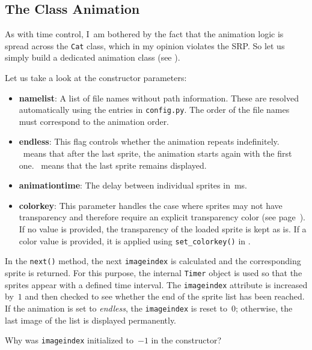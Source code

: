 \subsection{The Class Animation}

As with time control, I~am bothered by the fact that the animation logic is spread across the \texttt{Cat} class, which in my opinion violates the SRP. So let us simply build a dedicated animation class (see ).

Let us take a look at the constructor parameters:
\begin{itemize}
	\item \textbf{namelist}: A list of file names without path information. These are resolved automatically using the entries in \texttt{config.py}. The order of the file names must correspond to the animation order.
	
	\item \textbf{endless}: This flag controls whether the animation repeats indefinitely.  
	\true\ means that after the last sprite, the animation starts again with the first one.  
	\false\ means that the last sprite remains displayed.
	
	\item \textbf{animationtime}: The delay between individual sprites in~\unit{ms}.
	
	\item \textbf{colorkey}: This parameter handles the case where sprites may not have transparency and therefore require an explicit transparency color (see page~\pageref{pageTransparenz}).  
	If no value is provided, the transparency of the loaded sprite is kept as is.  
	If a color value is provided, it is applied using \texttt{set\_colorkey()} in .
\end{itemize}

In the \texttt{next()} method, the next \texttt{imageindex} is calculated and the corresponding sprite is returned. For this purpose, the internal \texttt{Timer} object is used so that the sprites appear with a defined time interval. The \texttt{imageindex} attribute is increased by~$1$ and then checked to see whether the end of the sprite list has been reached. If the animation is set to \emph{endless}, the \texttt{imageindex} is reset to~$0$; otherwise, the last image of the list is displayed permanently.

\begin{hintbox}
	Why was \texttt{imageindex} initialized to~$-1$ in the constructor?
\end{hintbox}

